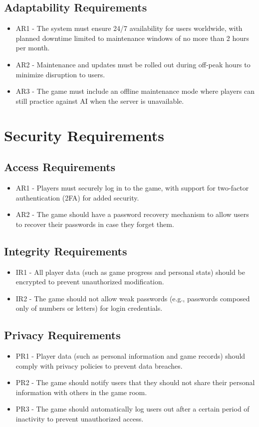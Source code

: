 \documentclass{article}
\begin{document}
\subsection{Adaptability Requirements}
\begin{itemize}
    \item AR1 - The system must ensure 24/7 availability for users worldwide, with planned downtime limited to maintenance windows of no more than 2 hours per month.
    \item AR2 - Maintenance and updates must be rolled out during off-peak hours to minimize disruption to users.
    \item AR3 - The game must include an offline maintenance mode where players can still practice against AI when the server is unavailable.
\end{itemize}

\section{Security Requirements}

\subsection{Access Requirements}
\begin{itemize}
    \item AR1 - Players must securely log in to the game, with support for two-factor authentication (2FA) for added security.
    \item AR2 - The game should have a password recovery mechanism to allow users to recover their passwords in case they forget them.
\end{itemize}

\subsection{Integrity Requirements}
\begin{itemize}
    \item IR1 - All player data (such as game progress and personal stats) should be encrypted to prevent unauthorized modification.
    \item IR2 - The game should not allow weak passwords (e.g., passwords composed only of numbers or letters) for login credentials.
\end{itemize}

\subsection{Privacy Requirements}
\begin{itemize}
    \item PR1 - Player data (such as personal information and game records) should comply with privacy policies to prevent data breaches.
    \item PR2 - The game should notify users that they should not share their personal information with others in the game room.
    \item PR3 - The game should automatically log users out after a certain period of inactivity to prevent unauthorized access.
\end{itemize}
\end{document}

